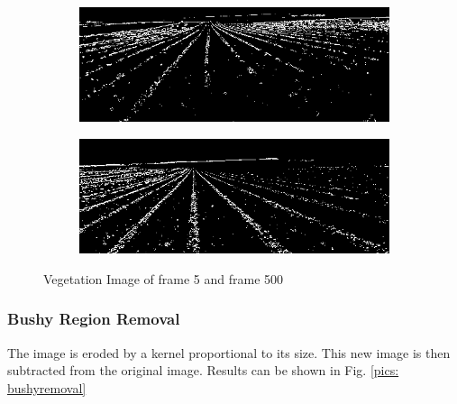 \begin{figure}[H]
\centering
\begin{subfigure}{0.49\textwidth}
    \includegraphics[width=\textwidth]{Report/images/VEGEIMG5.png}
    \label{fig:first}
\end{subfigure}
\begin{subfigure}{0.49\textwidth}%
    \includegraphics[width=\textwidth]{Report/images/VEGEIMG500.png}
    \label{fig:second}
\end{subfigure}
\caption{Vegetation Image of frame 5 and frame 500}
\end{figure}
\label{pics: Vegestablealongtime}

\subsubsection{Bushy Region Removal}

The image is eroded by a kernel proportional to its size. This new image is then subtracted from the original image. Results can be shown in Fig. \ref{pics: bushyremoval} 

